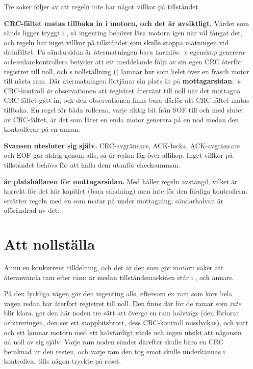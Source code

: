 Tre saker följer av att regeln inte har något villkor på tillståndet.

\textbf{CRC-fältet matas tillbaka in i motorn, och det är avsiktligt.} Värdet som sänds ligger tryggt
i , så ingenting behöver läsa motorn igen när  väl fångat det, och
regeln har inget villkor på tillståndet som skulle stoppa matningen vid datafältet. På sändarsidan är
återmatningen bara harmlös: :s egenskap generera-och-sedan-kontrollera betyder att ett
meddelande följt av sin egen CRC återför registret till noll, och s nollställning
() lämnar hur som helst över en fräsch motor till nästa ram. Där
återmatningen förtjänar sin plats är på \textbf{mottagarsidan}: :s CRC-kontroll
\emph{är} observationen att registret återvänt till noll när det mottagna CRC-fältet gått in, och den
observationen finns bara därför att CRC-fältet matas tillbaka. En regel för båda rollerna, varje
riktig bit från SOF till och med slutet av CRC-fältet, är det som låter en enda motor generera på en
nod medan den kontrollerar på en annan.

\textbf{Svansen utesluter sig själv.} CRC-avgränsare, ACK-lucka, ACK-avgränsare och EOF går aldrig
genom  alls, så  är redan låg över allihop. Inget villkor på
tillståndet behövs för att hålla dem utanför checksumman.

\textbf{ är platshållaren för mottagarsidan.} Med  håller regeln
 avstängd, vilket är korrekt för det här kapitlet (bara sändning) men inte för den färdiga
kontrollern.  ersätter regeln med en som matar  på
 under mottagning; sändarhalvan är oförändrad av det.

\section{Att nollställa }
\label{c16:sec:crcclear}

Ännu en konkurrent tilldelning, och det är den som gör motorn säker att återanvända ram efter ram:
 är  medan tillståndsmaskinen står i , och 
annars.

På den lyckliga vägen gör den ingenting alls, eftersom en ram som körs hela vägen redan har återfört
registret till noll. Den finns där för de ramar som \emph{inte} blir klara.  ger den
här noden tre sätt att överge en ram halvvägs (den förlorar arbitreringen, den ser ett
stoppbitsbrott, dess CRC-kontroll misslyckas), och vart och ett lämnar motorn med ett halvfärdigt
värde och ingen utsikt att någonsin nå noll av sig själv. Varje ram noden sänder därefter skulle bära
en CRC beräknad ur den resten, och varje ram den tog emot skulle underkännas i kontrollen, tills
någon tryckte på reset.

